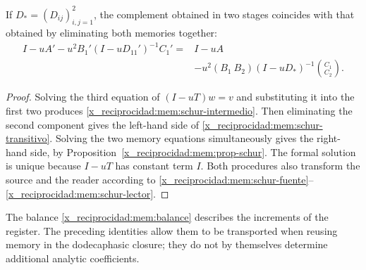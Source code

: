 \begin{proposition}
If \(D_*=(D_{ij})_{i,j=1}^2\), the complement obtained in two stages
coincides with that obtained by eliminating both memories together:
\begin{equation}
 \begin{split}
 I-uA'-u^2B_1'(I-uD_{11}')^{-1}C_1'
 ={}&I-uA\\
 &-u^2(B_1\ B_2)(I-uD_*)^{-1}\binom{C_1}{C_2}.
 \end{split}
 \label{x_reciprocidad:mem:schur-transitivo}
\end{equation}
\end{proposition}
\begin{proof}
Solving the third equation of \((I-uT)w=v\) and substituting it into the
first two produces \eqref{x_reciprocidad:mem:schur-intermedio}. Then eliminating the
second component gives the left-hand side of
\eqref{x_reciprocidad:mem:schur-transitivo}. Solving the two memory equations simultaneously
gives the right-hand side, by Proposition~\ref{x_reciprocidad:mem:prop-schur}.
The formal solution is unique because \(I-uT\) has constant term
\(I\). Both procedures also transform the source and
the reader according to \eqref{x_reciprocidad:mem:schur-fuente}--\eqref{x_reciprocidad:mem:schur-lector}.
\end{proof}

The balance \eqref{x_reciprocidad:mem:balance} describes the increments of the register.
The preceding identities allow them to be transported when reusing memory
in the dodecaphasic closure; they do not by themselves determine additional
analytic coefficients.


